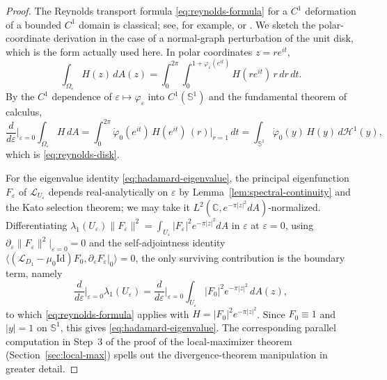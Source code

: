 \documentclass[a4paper,11pt,reqno]{amsart}
\numberwithin{equation}{section}
\theoremstyle{plain} %
\theoremstyle{definition} %
\theoremstyle{remark}
\newcommand{\C}{\mathbb{C}}
\begin{document}
\begin{proof}
The Reynolds transport formula \eqref{eq:reynolds-formula} for a \(C^1\)
deformation of a bounded \(C^1\) domain is classical; see, for example,
\cite[\S 5.9]{Henrot-Pierre} or \cite[Ch.~2]{Sokolowski-Zolesio}. We sketch
the polar-coordinate derivation in the case of a normal-graph perturbation
of the unit disk, which is the form actually used here. In polar
coordinates \(z=re^{it}\),
\[
\int_{\Omega_\varepsilon}H(z)\,dA(z)
=
\int_0^{2\pi}\int_0^{1+\varphi_\varepsilon(e^{it})}H(re^{it})\,r\,dr\,dt.
\]
By the \(C^1\) dependence of \(\varepsilon\mapsto \varphi_\varepsilon\) into
\(C^1(\mathbb S^1)\) and the fundamental theorem of calculus,
\[
\frac{d}{d\varepsilon}\Big|_{\varepsilon=0}\int_{\Omega_\varepsilon}H\,dA
=
\int_0^{2\pi}\dot\varphi_0(e^{it})\,H(e^{it})\,(r)\Big|_{r=1}\,dt
=
\int_{\mathbb S^1}\dot\varphi_0(y)\,H(y)\,d\mathcal H^1(y),
\]
which is \eqref{eq:reynolds-disk}.

For the eigenvalue identity \eqref{eq:hadamard-eigenvalue}, the principal
eigenfunction \(F_\varepsilon\) of \(\mathcal L_{U_\varepsilon}\) depends
real-analytically on \(\varepsilon\) by Lemma~\ref{lem:spectral-continuity}
and the Kato selection theorem; we may take it
\(L^2(\C, e^{-\pi|z|^2}dA)\)-normalized. Differentiating
\(\lambda_1(U_\varepsilon)\|F_\varepsilon\|^2
=
\int_{U_\varepsilon}|F_\varepsilon|^2 e^{-\pi|z|^2}dA\)
in \(\varepsilon\) at \(\varepsilon=0\), using
\(\partial_\varepsilon\|F_\varepsilon\|^2|_{\varepsilon=0}=0\) and the
self-adjointness identity
\(\langle (\mathcal L_{D_1}-\mu_0\mathrm{Id})F_0,\partial_\varepsilon
F_\varepsilon|_0\rangle=0\), the only surviving contribution is the boundary
term, namely
\[
\frac{d}{d\varepsilon}\Big|_{\varepsilon=0}\lambda_1(U_\varepsilon)
=
\frac{d}{d\varepsilon}\Big|_{\varepsilon=0}
\int_{U_\varepsilon}|F_0|^2 e^{-\pi|z|^2}\,dA(z),
\]
to which \eqref{eq:reynolds-formula} applies with
\(H=|F_0|^2 e^{-\pi|z|^2}\). Since \(F_0\equiv 1\) and \(|y|=1\) on
\(\mathbb S^1\), this gives \eqref{eq:hadamard-eigenvalue}. The corresponding
parallel computation in Step~3 of the proof of the local-maximizer theorem
(Section~\ref{sec:local-max}) spells out the divergence-theorem manipulation
in greater detail.
\end{proof}

\medskip
\end{document}
